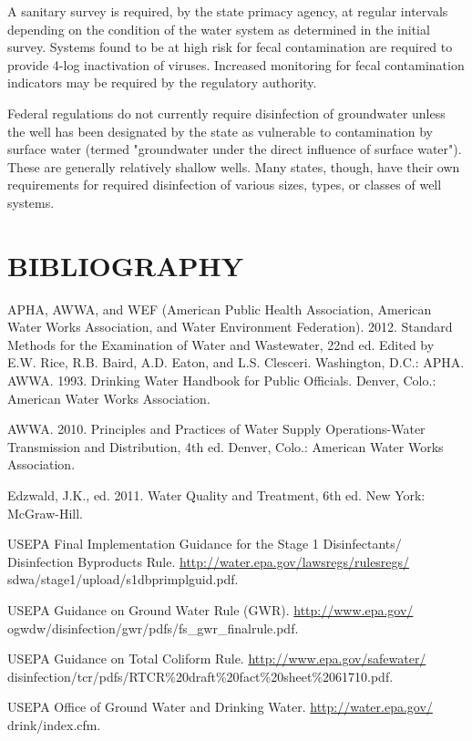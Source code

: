 \documentclass[10pt]{article}
\begin{document}
A sanitary survey is required, by the state primacy agency, at regular intervals depending on the condition of the water system as determined in the initial survey. Systems found to be at high risk for fecal contamination are required to provide 4-log inactivation of viruses. Increased monitoring for fecal contamination indicators may be required by the regulatory authority.

Federal regulations do not currently require disinfection of groundwater unless the well has been designated by the state as vulnerable to contamination by surface water (termed "groundwater under the direct influence of surface water"). These are generally relatively shallow wells. Many states, though, have their own requirements for required disinfection of various sizes, types, or classes of well systems.

\section{BIBLIOGRAPHY}
APHA, AWWA, and WEF (American Public Health Association, American Water Works Association, and Water Environment Federation). 2012. Standard Methods for the Examination of Water and Wastewater, 22nd ed. Edited by E.W. Rice, R.B. Baird, A.D. Eaton, and L.S. Clesceri. Washington, D.C.: APHA. AWWA. 1993. Drinking Water Handbook for Public Officials. Denver, Colo.: American Water Works Association.

AWWA. 2010. Principles and Practices of Water Supply Operations-Water Transmission and Distribution, 4th ed. Denver, Colo.: American Water Works Association.

Edzwald, J.K., ed. 2011. Water Quality and Treatment, 6th ed. New York: McGraw-Hill.

USEPA Final Implementation Guidance for the Stage 1 Disinfectants/ Disinfection Byproducts Rule. \href{http://water.epa.gov/lawsregs/rulesregs/}{http://water.epa.gov/lawsregs/rulesregs/} sdwa/stage1/upload/s1dbprimplguid.pdf.

USEPA Guidance on Ground Water Rule (GWR). \href{http://www.epa.gov/}{http://www.epa.gov/} ogwdw/disinfection/gwr/pdfs/fs\_gwr\_finalrule.pdf.

USEPA Guidance on Total Coliform Rule. \href{http://www.epa.gov/safewater/}{http://www.epa.gov/safewater/} disinfection/tcr/pdfs/RTCR\%20draft\%20fact\%20sheet\%2061710.pdf.

USEPA Office of Ground Water and Drinking Water. \href{http://water.epa.gov/}{http://water.epa.gov/} drink/index.cfm.
\end{document}
